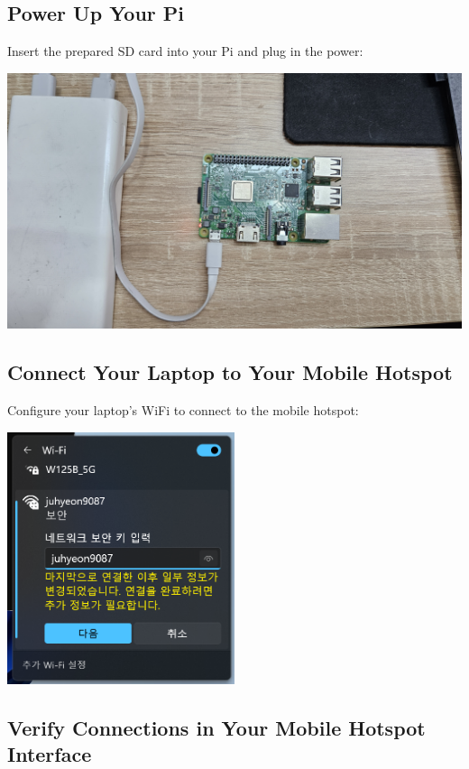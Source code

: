 \documentclass[
  letterpaper,
]{scrbook}
\begin{document}
\subsection{Power Up Your Pi}\label{power-up-your-pi}

Insert the prepared SD card into your Pi and plug in the power:

\includegraphics{content/material/ch2/plug_pi_wifi.jpg}

\subsection{Connect Your Laptop to Your Mobile
Hotspot}\label{connect-your-laptop-to-your-mobile-hotspot}

Configure your laptop's WiFi to connect to the mobile hotspot:

\includegraphics[width=0.5\textwidth,height=\textheight]{content/material/ch2/laptop_wifi.png}

\subsection{Verify Connections in Your Mobile Hotspot
Interface}\label{verify-connections-in-your-mobile-hotspot-interface}
\end{document}
